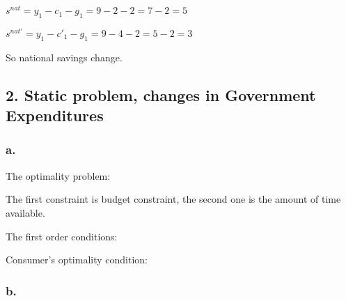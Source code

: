 \documentclass{article}
\begin{document}
$s^{nat}=y_{1}-c_{1}-g_{1}=9-2-2=7-2=\boxed{5}$

$s^{nat\prime}=y_{1}-c'_{1}-g_{1}=9-4-2=5-2=\boxed{3}$

So national savings change.

\subsection*{\textrm{2. Static problem, changes in Government Expenditures}}

\subsubsection*{\textrm{a.}}

The optimality problem:


The first constraint is budget constraint, the second one is the amount of time available.

The first order conditions:


Consumer's optimality condition:

\fbox{%
\parbox[c]{\textwidth}{\
\begin{equation*}
    \begin{aligned}
    \dfrac{U_{l}\left(c,l\right)}{U_{c}\left(c,l\right)}=w
    \end{aligned}
\end{equation*}%
}}

\subsubsection*{\textrm{b.}}
\end{document}
